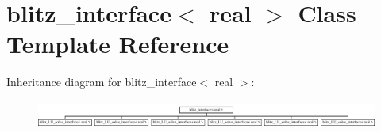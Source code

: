 \hypertarget{classblitz__interface}{}\section{blitz\+\_\+interface$<$ real $>$ Class Template Reference}
\label{classblitz__interface}
Inheritance diagram for blitz\+\_\+interface$<$ real $>$\+:\begin{figure}[H]
\begin{center}
\leavevmode
\includegraphics[height=0.915033cm]{classblitz__interface}
\end{center}
\end{figure}
